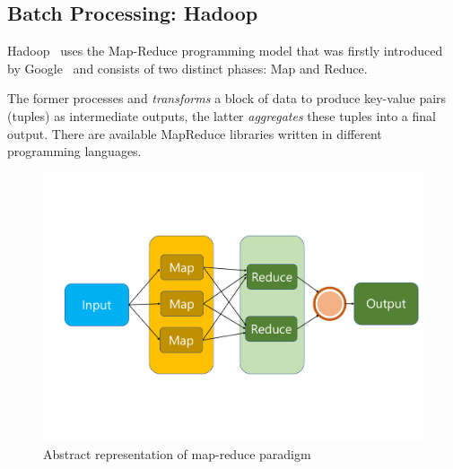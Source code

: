 \subsection{Batch Processing: Hadoop}\label{sec:map_reduce_hadoop}
Hadoop~\cite{misc:ApacheHadoop} uses the Map-Reduce programming model that was firstly introduced by Google~\cite{misc:GoogleMapReduce} and consists of two distinct phases: Map and Reduce.

The former processes and \textit{transforms} a block of data to produce key-value pairs (tuples) as intermediate outputs, the latter \textit{aggregates} these tuples into a final output.
There are available MapReduce libraries written in different programming languages. 
\begin{figure}
	\vspace{-1.7cm}
	\centering
	\includegraphics[width=\columnwidth]{Images/map_reduce_1.pdf}  
	\vspace{-2cm}
	\caption[map-reduce model]{Abstract representation of map-reduce paradigm}
	\vspace{0.5cm}
	\label{fig:mapReduce}
\end{figure}

